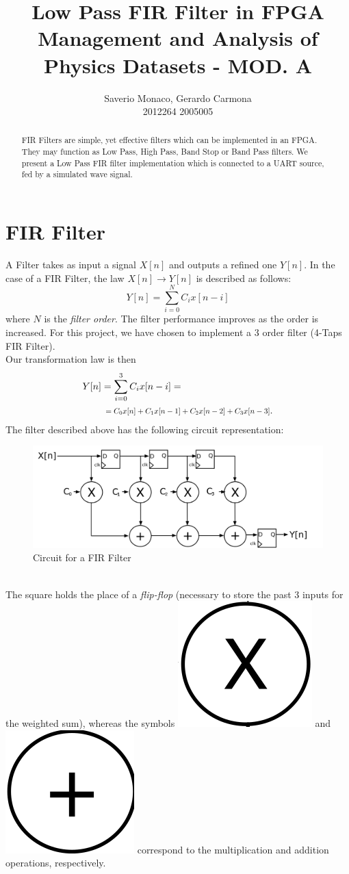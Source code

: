 \documentclass[11pt,a4paper,twocolumn]{IEEEtran}
\author{Saverio Monaco, Gerardo Carmona\\ 2012264\hspace{1.5cm} 2005005\\ \sepline}
\title{\textbf{Low Pass FIR Filter in FPGA}\\ Management and Analysis of Physics Datasets - MOD. A}
\newcommand*{\Scale}[2][4]{\scalebox{#1}{$#2$}}
\begin{document}
	\maketitle
	\begin{abstract}
		FIR Filters are simple, yet effective filters which can be implemented in an FPGA. They may function as Low Pass, High Pass, Band Stop or Band Pass filters. We present a Low Pass FIR filter implementation which is connected to a UART source, fed by a simulated wave signal.
	\end{abstract}
	\section{FIR Filter}
	A Filter takes as input a signal $X[n]$ and outputs a refined one $Y[n]$. In the case of a FIR Filter, the law $X[n]\to Y[n]$ is described as follows: 
	$$ Y[n] = \sum_{i=0}^N C_i x[n-i] $$
	where $N$ is the \textit{filter order}. The filter performance improves as the order is increased. For this project, we have chosen to implement a 3 order filter (4-Taps FIR Filter).\\ Our transformation law is then
	$$\begin{aligned} Y[n]&=\sum_{i=0}^3 C_ix[n-i]=\\ & \Scale[0.8]{\hspace*{.2cm}=C_0x[n]+C_1x[n-1]+C_2x[n-2]+C_3x[n-3]}.\end{aligned}$$
	The filter described above has the following circuit representation:
	\begin{figure}[h]
		\centering
		\includegraphics[width=1\linewidth]{img/FIR_direct_svg}
		\caption{Circuit for a FIR Filter}
	\end{figure}\\
	The square holds the place of a \emph{flip-flop} (necessary to store the past 3 inputs for the weighted sum), whereas the symbols \includegraphics[width=0.05\linewidth]{img/x} and \includegraphics[width=0.05\linewidth]{img/+} correspond to the multiplication and addition operations, respectively.
\end{document}
